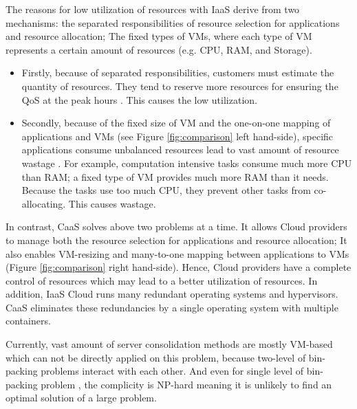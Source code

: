 The reasons for low utilization of resources with IaaS derive from two mechanisms: the separated responsibilities of resource selection for applications and resource allocation; The fixed types of VMs, where each type of VM represents a certain amount of resources (e.g. CPU, RAM, and Storage). 
\begin{itemize}
	\item Firstly, because of separated responsibilities, customers must estimate the quantity of resources. They tend to reserve more resources for ensuring the QoS at the peak hours \cite{Chaisiri:2012cv}. This causes the low utilization.
	\item Secondly, because of the fixed size of VM and the one-on-one mapping of applications and VMs (see Figure \ref{fig:comparison} left hand-side), specific applications consume unbalanced resources lead to vast amount of resource wastage \cite{Tomas:2013iv}. For example, computation intensive tasks consume much more CPU than RAM; a fixed type of VM provides much more RAM than it needs. Because the tasks use too much CPU, they prevent other tasks from co-allocating.
	This causes wastage.
\end{itemize}

In contrast, CaaS solves above two problems at a time. It allows Cloud providers to manage both the resource selection for applications and resource allocation; It also enables VM-resizing and many-to-one mapping between applications to VMs (Figure \ref{fig:comparison} right hand-side).
Hence, Cloud providers have a complete control of resources which may lead to a better utilization of resources. 
In addition, IaaS Cloud runs many redundant operating systems and hypervisors. CaaS eliminates these redundancies by a single operating system with multiple containers.

\vspace{10mm}

Currently, vast amount of server consolidation methods are mostly VM-based which can not be directly applied on this problem, because two-level of bin-packing problems interact with each other. And even for single level of bin-packing problem \cite{Mann:2015ua}, the complicity is NP-hard meaning it is unlikely to find an optimal solution of a large problem.

